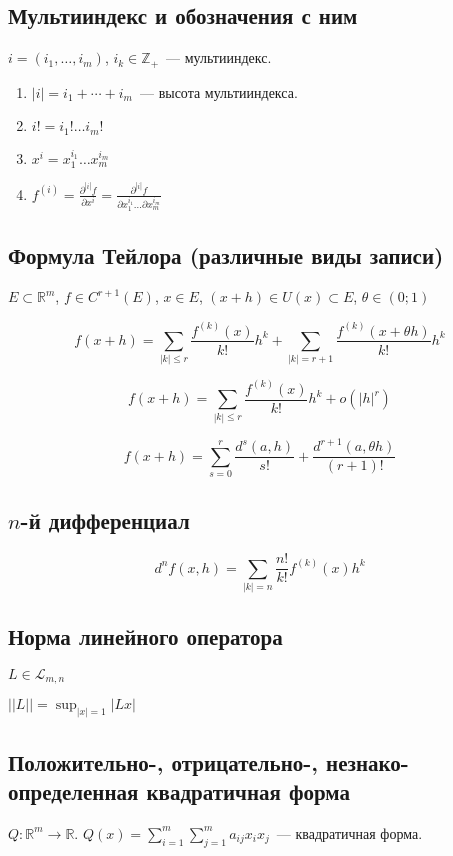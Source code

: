 \documentclass[paper=a4, fontsize=11pt]{article}
\begin{document}
\subsection{Мультииндекс и обозначения с ним}
$i = (i_1,\dots,i_m)$, $i_k \in \mathds{Z}_+$~--- мультииндекс.
\begin{enumerate}
    \item $|i| = i_1+\cdots+i_m$~--- высота мультииндекса.
    \item $i! = i_1! \dots i_m!$
    \item $x^i = x_1^{i_1} \dots x_m^{i_m}$
    \item $f^{(i)} = \frac{\partial^{|i|}f}{\partial x^i} = \frac{\partial^{|i|}f}{\partial x_1^{i_1} \dots \partial x_m^{i_m}}$
\end{enumerate}

\subsection{Формула Тейлора (различные виды записи)}
$E \subset \mathds{R}^m$, $f \in C^{r+1}(E)$, $x \in E$, $(x+h) \in U(x) \subset E$, $\theta \in (0;1)$

$$f(x+h) = \sum_{|k| \leq r} \frac{f^{(k)}(x)}{k!} h^k + \sum_{|k|=r+1} \frac{f^{(k)}(x+\theta h)}{k!} h^k$$

$$f(x+h) = \sum_{|k| \leq r} \frac{f^{(k)}(x)}{k!} h^k + o(|h|^r)$$

$$f(x+h) = \sum_{s=0}^{r} \frac{d^s(a,h)}{s!} + \frac{d^{r+1}(a,\theta h)}{(r+1)!}$$

\subsection{$n$-й дифференциал}
$$d^n f(x,h) = \sum_{|k|=n} \frac{n!}{k!} f^{(k)}(x) h^k$$

\subsection{Норма линейного оператора}
$L \in \mathscr{L}_{m,n}$

$||L|| = \sup_{|x|=1} |Lx|$

\subsection{Положительно-, отрицательно-, незнако- определенная квадратичная форма}
$Q: \mathds{R}^m \rightarrow \mathds{R}$. $Q(x) = \sum_{i=1}^{m} \sum_{j=1}^{m} a_{ij} x_i x_j$~--- квадратичная форма.
\end{document}
